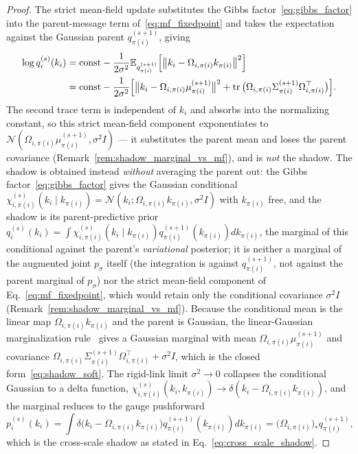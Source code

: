 \documentclass[11pt]{article}
\begin{document}
\begin{proof}
The strict mean-field update substitutes the Gibbs factor~\eqref{eq:gibbs_factor} into the parent-message term of~\eqref{eq:mf_fixedpoint} and takes the expectation against the Gaussian parent $q_{\pi(i)}^{(s+1)}$, giving
\begin{align}
\log q_i^{(s)}(k_i) &= \text{const} - \frac{1}{2\sigma^2} \mathbb{E}_{q_{\pi(i)}^{(s+1)}}\Big[\big\|k_i - \Omega_{i,\pi(i)} k_{\pi(i)}\big\|^2\Big] \notag\\
&= \text{const} - \frac{1}{2\sigma^2}\Big[\big\|k_i - \Omega_{i,\pi(i)}\mu_{\pi(i)}^{(s+1)}\big\|^2 + \operatorname{tr}\big(\Omega_{i,\pi(i)}\Sigma_{\pi(i)}^{(s+1)}\Omega_{i,\pi(i)}^\top\big)\Big].
\end{align}
The second trace term is independent of $k_i$ and absorbs into the normalizing constant, so this strict mean-field component exponentiates to $\mathcal{N}(\Omega_{i,\pi(i)}\mu_{\pi(i)}^{(s+1)}, \sigma^2 I)$ — it substitutes the parent mean and loses the parent covariance (Remark~\ref{rem:shadow_marginal_vs_mf}), and is \emph{not} the shadow. The shadow is obtained instead \emph{without} averaging the parent out: the Gibbs factor~\eqref{eq:gibbs_factor} gives the Gaussian conditional $\chi_{i,\pi(i)}^{(s)}(k_i \mid k_{\pi(i)}) = \mathcal{N}(k_i; \Omega_{i,\pi(i)} k_{\pi(i)}, \sigma^2 I)$ with $k_{\pi(i)}$ free, and the shadow is its parent-predictive prior $q_i^{(s)}(k_i) = \int \chi_{i,\pi(i)}^{(s)}(k_i \mid k_{\pi(i)})  q_{\pi(i)}^{(s+1)}(k_{\pi(i)})  dk_{\pi(i)}$, the marginal of this conditional against the parent's \emph{variational} posterior; it is neither a marginal of the augmented joint $p_\sigma$ itself (the integration is against $q_{\pi(i)}^{(s+1)}$, not against the parent marginal of $p_\sigma$) nor the strict mean-field component of Eq.~\eqref{eq:mf_fixedpoint}, which would retain only the conditional covariance $\sigma^2 I$ (Remark~\ref{rem:shadow_marginal_vs_mf}). Because the conditional mean is the linear map $\Omega_{i,\pi(i)} k_{\pi(i)}$ and the parent is Gaussian, the linear-Gaussian marginalization rule~\cite[\S2.3.3]{Bishop2006} gives a Gaussian marginal with mean $\Omega_{i,\pi(i)}\mu_{\pi(i)}^{(s+1)}$ and covariance $\Omega_{i,\pi(i)}\Sigma_{\pi(i)}^{(s+1)}\Omega_{i,\pi(i)}^\top + \sigma^2 I$, which is the closed form~\eqref{eq:shadow_soft}. The rigid-link limit $\sigma^2 \to 0$ collapses the conditional Gaussian to a delta function, $\chi_{i,\pi(i)}^{(s)}(k_i, k_{\pi(i)}) \to \delta(k_i - \Omega_{i,\pi(i)} k_{\pi(i)})$, and the marginal reduces to the gauge pushforward
\begin{equation}
p_i^{(s)}(k_i)  =  \int \delta\big(k_i - \Omega_{i,\pi(i)} k_{\pi(i)}\big) q_{\pi(i)}^{(s+1)}(k_{\pi(i)})  dk_{\pi(i)}  =  \big(\Omega_{i,\pi(i)}\big)_* q_{\pi(i)}^{(s+1)},
\end{equation}
which is the cross-scale shadow as stated in Eq.~\eqref{eq:cross_scale_shadow}.
\end{proof}
\end{document}
